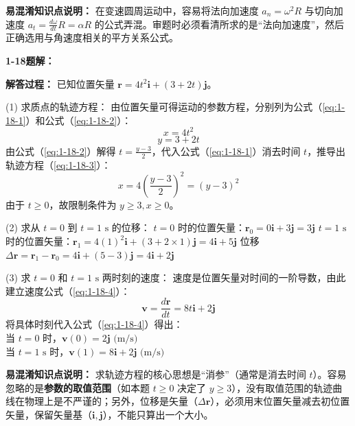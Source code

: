 \textbf{易混淆知识点说明：}
在变速圆周运动中，容易将法向加速度 $a_n = \omega^2 R$ 与切向加速度 $a_t = \frac{d\omega}{dt} R = \alpha R$ 的公式弄混。审题时必须看清所求的是“法向加速度”，然后正确选用与角速度相关的平方关系公式。

\vspace{2em}

\textbf{1-18题解：}
\setcounter{equation}{0}
\renewcommand{\theHequation}{1-18.\arabic{equation}}

\textbf{解答过程：}
已知位置矢量 $\mathbf{r} = 4t^2\mathbf{i} + (3 + 2t)\mathbf{j}$。

(1) 求质点的轨迹方程：
由位置矢量可得运动的参数方程，分别列为公式（\ref{eq:1-18-1}）和公式（\ref{eq:1-18-2}）：
\begin{equation}\label{eq:1-18-1}
	x = 4t^2
\end{equation}
\begin{equation}\label{eq:1-18-2}
	y = 3 + 2t
\end{equation}
由公式（\ref{eq:1-18-2}）解得 $t = \frac{y-3}{2}$，代入公式（\ref{eq:1-18-1}）消去时间 $t$，推导出轨迹方程（\ref{eq:1-18-3}）：
\begin{equation}\label{eq:1-18-3}
	x = 4\left(\frac{y-3}{2}\right)^2 = (y-3)^2
\end{equation}
由于 $t \ge 0$，故限制条件为 $y \ge 3, x \ge 0$。

(2) 求从 $t = 0$ 到 $t = 1\text{ s}$ 的位移：
$t = 0$ 时的位置矢量：$\mathbf{r}_0 = 0\mathbf{i} + 3\mathbf{j} = 3\mathbf{j}$
$t = 1\text{ s}$ 时的位置矢量：$\mathbf{r}_1 = 4(1)^2\mathbf{i} + (3 + 2\times1)\mathbf{j} = 4\mathbf{i} + 5\mathbf{j}$
位移 $\Delta\mathbf{r} = \mathbf{r}_1 - \mathbf{r}_0 = 4\mathbf{i} + (5 - 3)\mathbf{j} = 4\mathbf{i} + 2\mathbf{j}$

(3) 求 $t = 0$ 和 $t = 1\text{ s}$ 两时刻的速度：
速度是位置矢量对时间的一阶导数，由此建立速度公式（\ref{eq:1-18-4}）：
\begin{equation}\label{eq:1-18-4}
	\mathbf{v} = \frac{d\mathbf{r}}{dt} = 8t\mathbf{i} + 2\mathbf{j}
\end{equation}
将具体时刻代入公式（\ref{eq:1-18-4}）得出：\\
当 $t = 0$ 时，$\mathbf{v}(0) = 2\mathbf{j} \text{ (m/s)}$ \\
当 $t = 1\text{ s}$ 时，$\mathbf{v}(1) = 8\mathbf{i} + 2\mathbf{j} \text{ (m/s)}$

\textbf{易混淆知识点说明：}
求轨迹方程的核心思想是“消参”（通常是消去时间 $t$）。容易忽略的是\textbf{参数的取值范围}（如本题 $t \ge 0$ 决定了 $y \ge 3$），没有取值范围的轨迹曲线在物理上是不严谨的；另外，位移是矢量（$\Delta \mathbf{r}$），必须用末位置矢量减去初位置矢量，保留矢量基（$\mathbf{i}, \mathbf{j}$），不能只算出一个大小。

